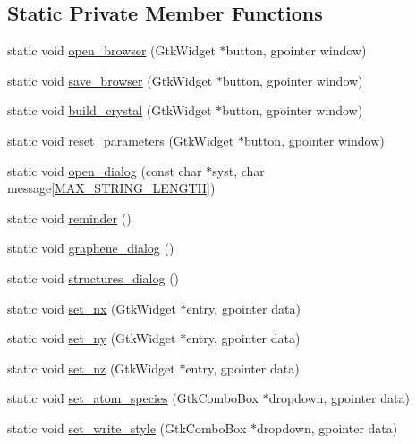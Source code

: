 \subsection*{Static Private Member Functions}
\begin{DoxyCompactItemize}
\item 
static void \hyperlink{class_gui_a0361446932ea24631a9a309ecd4918e2}{open\+\_\+browser} (Gtk\+Widget $\ast$button, gpointer window)
\item 
static void \hyperlink{class_gui_a96dd2566bc45f990c6b8ab59d1344153}{save\+\_\+browser} (Gtk\+Widget $\ast$button, gpointer window)
\item 
static void \hyperlink{class_gui_a7d50ca2f38ae76e0cfd9444651542d4b}{build\+\_\+crystal} (Gtk\+Widget $\ast$button, gpointer window)
\item 
static void \hyperlink{class_gui_a640296a9a21d37a07e963ff3eb6d3590}{reset\+\_\+parameters} (Gtk\+Widget $\ast$button, gpointer window)
\item 
static void \hyperlink{class_gui_abe49e057b7c93c1432a20a7ed57fcbdf}{open\+\_\+dialog} (const char $\ast$syst, char message\mbox{[}\hyperlink{common_8h_a6789ebc0df71a8ef76bfbb4fb5f74aad}{M\+A\+X\+\_\+\+S\+T\+R\+I\+N\+G\+\_\+\+L\+E\+N\+G\+T\+H}\mbox{]})
\item 
static void \hyperlink{class_gui_a37d0bad8546197105edfa23a2e6f42ae}{reminder} ()
\item 
static void \hyperlink{class_gui_a95855da00553d4523403a6bfd58e49ac}{graphene\+\_\+dialog} ()
\item 
static void \hyperlink{class_gui_a4232273b39d2b5b3e7a7fdad6a0fc37e}{structures\+\_\+dialog} ()
\item 
static void \hyperlink{class_gui_ab85fa47609a7b87c756fe6c2ebc1c199}{set\+\_\+nx} (Gtk\+Widget $\ast$entry, gpointer data)
\item 
static void \hyperlink{class_gui_a9f0033b84bcee926322da0abf7e9ee16}{set\+\_\+ny} (Gtk\+Widget $\ast$entry, gpointer data)
\item 
static void \hyperlink{class_gui_a3fc8d99c08f107497b8ab3ef312fe60b}{set\+\_\+nz} (Gtk\+Widget $\ast$entry, gpointer data)
\item 
static void \hyperlink{class_gui_a6e21579571ee32042c0723818da76faa}{set\+\_\+atom\+\_\+species} (Gtk\+Combo\+Box $\ast$dropdown, gpointer data)
\item 
static void \hyperlink{class_gui_abf2197f1d93849923cb63de803478b87}{set\+\_\+write\+\_\+style} (Gtk\+Combo\+Box $\ast$dropdown, gpointer data)
\item 

\end{DoxyCompactItemize}
